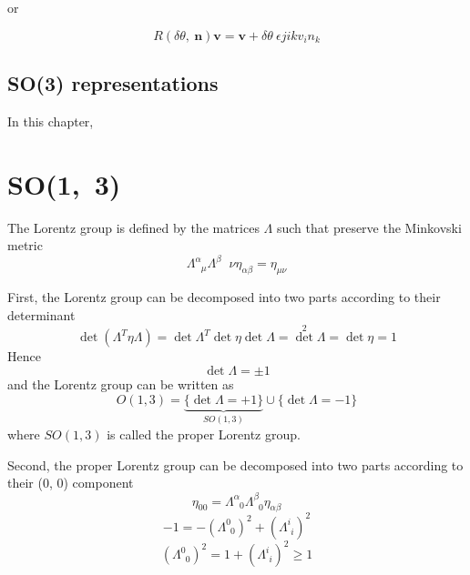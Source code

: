     or 

    \begin{equation*}
        R(\delta \theta, ~ \mathbf n) \mathbf v = \mathbf v + \delta \theta ~ \epsilon{jik} v_i n_k 
    \end{equation*}

\section{SO(3) representations}

    In this chapter, 

\chapter{SO(1,~3)}

    The Lorentz group is defined by the matrices $\Lambda$ such that preserve the Minkovski metric 
    \begin{equation}\label{lorentz}
        \Lambda^\alpha_{\phantom \alpha \mu} \Lambda^\beta{\phantom \beta \nu} \eta_{\alpha \beta} = \eta_{\mu \nu}
    \end{equation}

    First, the Lorentz group can be decomposed into two parts according to their determinant
    \begin{equation*}
        \det (\Lambda^T \eta \Lambda) = \det \Lambda^T \det \eta \det \Lambda = \det^2 \Lambda = \det \eta = 1
    \end{equation*}
    Hence 
    \begin{equation*}
        \det \Lambda = \pm 1
    \end{equation*}
    and the Lorentz group can be written as
    \begin{equation*}
        O(1,3) = \underbrace{\{\det \Lambda = +1\}}_{SO(1,3)} \cup \{\det \Lambda = - 1\} 
    \end{equation*}
    where $SO(1,3)$ is called the proper Lorentz group.

    Second, the proper Lorentz group can be decomposed into two parts according to their (0, 0) component
    \begin{equation*}
        \eta_{00} = \Lambda^\alpha_{\phantom \alpha 0} \Lambda^\beta_{\phantom \beta 0} \eta_{\alpha \beta}
    \end{equation*}
    \begin{equation*}
        -1 = -(\Lambda^0_{\phantom 0 0})^2 + (\Lambda^i_{\phantom i i})^2
    \end{equation*}
    \begin{equation*}
        (\Lambda^0_{\phantom 0 0})^2 = 1 + (\Lambda^i_{\phantom i i})^2 \geq 1
    \end{equation*}
    
